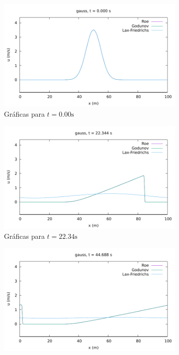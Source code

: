 \documentclass[12pt]{article}
\begin{document}
	\begin{figure}[h!]
		\centering
		\begin{subfigure}{0.4\textwidth}
			\centering
			\includegraphics[width=\textwidth]{../burgers1DVF/results/sol_periodicas/gauss/000.pdf}
			\caption*{Gráficas para $t=0.00\unit{\second}$}
			\label{fig:gauss-perio1}
		\end{subfigure}\hfill
		\begin{subfigure}{0.4\textwidth}
			\centering
			\includegraphics[width=\textwidth]{../burgers1DVF/results/sol_periodicas/gauss/021.pdf}
			\caption*{Gráficas para $t=22.34\unit{\second}$}
			\label{fig:gauss-perio2}
		\end{subfigure}\par
		\begin{subfigure}{0.4\textwidth}
			\centering
			\includegraphics[width=\textwidth]{../burgers1DVF/results/sol_periodicas/gauss/042.pdf}

\end{subfigure}
\end{figure}
\end{document}
